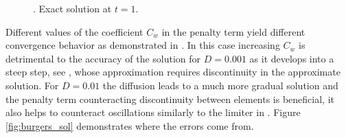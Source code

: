 \begin{example}
\begin{figure}[h]
	\caption{. Exact solution at $t = 1$.}
	\label{fig:burgers_hesthaven_ext}
\end{figure}
Different values of the coefficient $C_w$ in the penalty term yield different convergence
behavior as demonstrated in . In this case increasing $C_w$ is detrimental to the accuracy of the solution for $D=0.001$ as it
develops into a steep step, see , whose approximation
requires discontinuity in the approximate solution. For $D=0.01$ the diffusion leads to a much
more gradual solution and the penalty term counteracting discontinuity between elements
is beneficial, it also helps to counteract oscillations similarly to the limiter in
. \todo Figure \ref{fig:burgers_sol} demonstrates where the errors come 
from.


\end{example}
